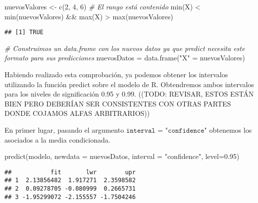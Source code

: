 \documentclass[
]{article}
\newenvironment{Shaded}{\begin{snugshade}}{\end{snugshade}}
\newcommand{\AttributeTok}[1]{\textcolor[rgb]{0.77,0.63,0.00}{#1}}
\newcommand{\CommentTok}[1]{\textcolor[rgb]{0.56,0.35,0.01}{\textit{#1}}}
\newcommand{\DecValTok}[1]{\textcolor[rgb]{0.00,0.00,0.81}{#1}}
\newcommand{\FloatTok}[1]{\textcolor[rgb]{0.00,0.00,0.81}{#1}}
\newcommand{\FunctionTok}[1]{\textcolor[rgb]{0.00,0.00,0.00}{#1}}
\newcommand{\NormalTok}[1]{#1}
\newcommand{\OtherTok}[1]{\textcolor[rgb]{0.56,0.35,0.01}{#1}}
\newcommand{\SpecialCharTok}[1]{\textcolor[rgb]{0.00,0.00,0.00}{#1}}
\newcommand{\StringTok}[1]{\textcolor[rgb]{0.31,0.60,0.02}{#1}}
\begin{document}
\begin{Shaded}
\begin{Highlighting}[]
\NormalTok{nuevosValores }\OtherTok{\textless{}{-}} \FunctionTok{c}\NormalTok{(}\DecValTok{2}\NormalTok{, }\DecValTok{4}\NormalTok{, }\DecValTok{6}\NormalTok{)}
\CommentTok{\# El rango está contenido}
\FunctionTok{min}\NormalTok{(X) }\SpecialCharTok{\textless{}} \FunctionTok{min}\NormalTok{(nuevosValores) }\SpecialCharTok{\&\&} \FunctionTok{max}\NormalTok{(X) }\SpecialCharTok{\textgreater{}} \FunctionTok{max}\NormalTok{(nuevosValores)}
\end{Highlighting}
\end{Shaded}

\begin{verbatim}
## [1] TRUE
\end{verbatim}

\begin{Shaded}
\begin{Highlighting}[]
\CommentTok{\# Construimos un data.frame  con los nuevos datos ya que predict necesita este formato para sus predicciones}
\NormalTok{nuevosDatos }\OtherTok{=} \FunctionTok{data.frame}\NormalTok{(}\StringTok{"X"} \OtherTok{=}\NormalTok{ nuevosValores)}
\end{Highlighting}
\end{Shaded}

Habiendo realizado esta comprobación, ya podemos obtener los intervalos
utilizando la función predict sobre el modelo de R. Obtendremos ambos
intervalos para los niveles de significación 0.95 y 0.99. ((TODO:
REVISAR, ESTOS ESTÁN BIEN PERO DEBERÍAN SER CONSISTENTES CON OTRAS
PARTES DONDE COJAMOS ALFAS ARBITRARIOS))

En primer lugar, pasando el argumento
\(\texttt{interval = "confidence"}\) obtenemos los asociados a la media
condicionada.

\begin{Shaded}
\begin{Highlighting}[]
\FunctionTok{predict}\NormalTok{(modelo, }\AttributeTok{newdata =}\NormalTok{ nuevosDatos, }\AttributeTok{interval =} \StringTok{"confidence"}\NormalTok{, }\AttributeTok{level=}\FloatTok{0.95}\NormalTok{)}
\end{Highlighting}
\end{Shaded}

\begin{verbatim}
##           fit       lwr        upr
## 1  2.13856482  1.917271  2.3598582
## 2  0.09278705 -0.080999  0.2665731
## 3 -1.95299072 -2.155557 -1.7504246
\end{verbatim}
\end{document}
